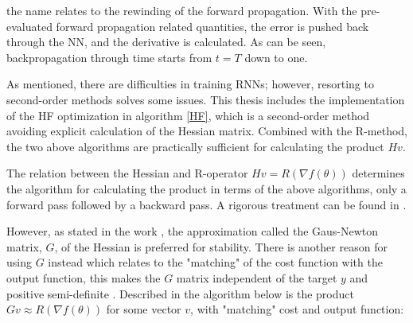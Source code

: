 \noindent
the name relates to the rewinding of the forward propagation. With the pre-evaluated forward propagation related quantities, the error is pushed back through the NN, and the derivative is calculated. As can be seen, backpropagation through time starts from $t=T$ down to one.

As mentioned, there are difficulties in training RNNs; however, resorting to second-order methods solves some issues. This thesis includes the implementation of the HF optimization \cite{suts} in algorithm \ref{HF}, which is a second-order method avoiding explicit calculation of the Hessian matrix. Combined with the R-method, the two above algorithms are practically sufficient for calculating the product $Hv$. 

The relation between the Hessian and R-operator $Hv = R(\nabla f(\theta))$ determines the algorithm for calculating the product in terms of the above algorithms, only a forward pass followed by a backward pass. A rigorous treatment can be found in \cite{suts}.

However, as stated in the work \cite{suts}, the approximation called the Gaus-Newton matrix, \(G\), of the Hessian is preferred for stability. There is another reason for using $G$ instead which relates to the "matching" of the cost function with the output function, this makes the $G$ matrix independent of the target $y$ and positive semi-definite \cite{Martens2012}. Described in the algorithm below is the product \(Gv \approx R(\nabla f(\theta))\) for some vector $v$, with "matching" cost and output function:

\begin{algorithmic}[1]
    \EndFor
    \EndFor
    \State {}
\end{algorithmic}

